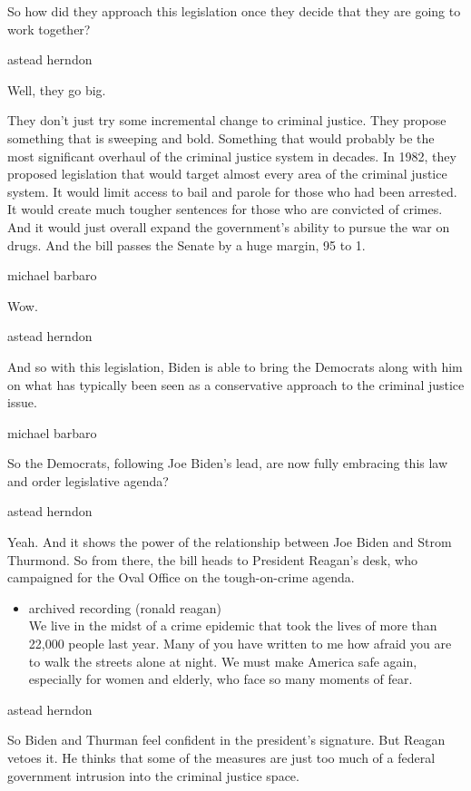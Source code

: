 So how did they approach this legislation once they decide that they are
going to work together?

astead herndon

Well, they go big.

They don't just try some incremental change to criminal justice. They
propose something that is sweeping and bold. Something that would
probably be the most significant overhaul of the criminal justice system
in decades. In 1982, they proposed legislation that would target almost
every area of the criminal justice system. It would limit access to bail
and parole for those who had been arrested. It would create much tougher
sentences for those who are convicted of crimes. And it would just
overall expand the government's ability to pursue the war on drugs. And
the bill passes the Senate by a huge margin, 95 to 1.

michael barbaro

Wow.

astead herndon

And so with this legislation, Biden is able to bring the Democrats along
with him on what has typically been seen as a conservative approach to
the criminal justice issue.

michael barbaro

So the Democrats, following Joe Biden's lead, are now fully embracing
this law and order legislative agenda?

astead herndon

Yeah. And it shows the power of the relationship between Joe Biden and
Strom Thurmond. So from there, the bill heads to President Reagan's
desk, who campaigned for the Oval Office on the tough-on-crime agenda.

\begin{itemize}
\tightlist
\item
  archived recording (ronald reagan)\\
  We live in the midst of a crime epidemic that took the lives of more
  than 22,000 people last year. Many of you have written to me how
  afraid you are to walk the streets alone at night. We must make
  America safe again, especially for women and elderly, who face so many
  moments of fear.
\end{itemize}

astead herndon

So Biden and Thurman feel confident in the president's signature. But
Reagan vetoes it. He thinks that some of the measures are just too much
of a federal government intrusion into the criminal justice space.

